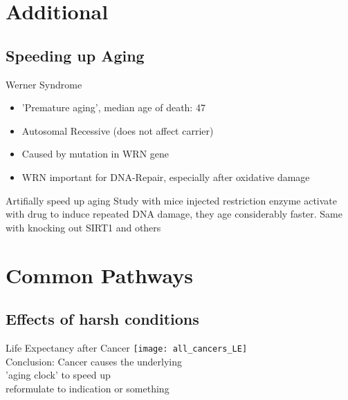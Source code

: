 \section{Additional}
\subsection{Speeding up Aging}

\begin{frame}[c]{Werner Syndrome}
    \large
    \begin{itemize}[<+(1)->]
        \item 'Premature aging', median age of death: 47
        \item Autosomal Recessive (does not affect carrier)
        \item Caused by mutation in WRN gene
        \item WRN important for DNA-Repair, especially after oxidative damage \cite{szekely2005werner}
    \end{itemize}

\end{frame}


\begin{frame}[c]{Artifially speed up aging}
    \large
    Study with mice injected restriction enzyme activate with drug to induce
    repeated DNA damage, they age considerably faster. Same with knocking out SIRT1 and others
\end{frame}

\section{Common Pathways}

\subsection{Effects of harsh conditions}

\begin{frame}[c]{Life Expectancy after Cancer}
    \large
    \texttt{[image: all\_cancers\_LE]} \\
    \cite{botta2019changes}
    \newline
    \newline
    \pause
    Conclusion: Cancer causes the underlying \\ 'aging clock' to speed up \\
    reformulate to indication or something
\end{frame}

